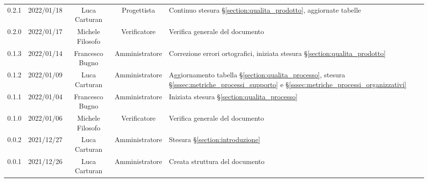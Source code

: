 \begin{center}
\begin{longtable}[c]{c | c | c | c | p{5cm}}
		0.2.1 & 2022/01/18 & Luca Carturan & Progettista & Continuo stesura §\ref{section:qualita_prodotto}, aggiornate tabelle\\
		0.2.0 & 2022/01/17 & Michele Filosofo & Verificatore & Verifica generale del documento\\
		0.1.3 & 2022/01/14 & Francesco Bugno & Amministratore & Correzione errori ortografici, iniziata stesura §\ref{section:qualita_prodotto}\\
		0.1.2 & 2022/01/09 & Luca Carturan & Amministratore & Aggiornamento tabella §\ref{section:qualita_processo}, stesura §\ref{sssec:metriche_processi_supporto} e §\ref{sssec:metriche_processi_organizzativi}\\
		0.1.1 & 2022/01/04 & Francesco Bugno & Amministratore & Iniziata stesura §\ref{section:qualita_processo}\\
		0.1.0 & 2022/01/06 & Michele Filosofo & Verificatore & Verifica generale del documento \\
		0.0.2 & 2021/12/27 & Luca Carturan & Amministratore & Stesura §\ref{section:introduzione}\\
		0.0.1 & 2021/12/26 & Luca Carturan & Amministratore & Creata struttura del documento
	\end{longtable}
\end{center}